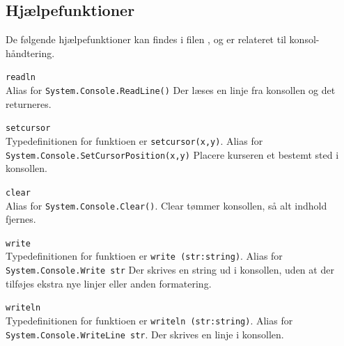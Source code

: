 \documentclass[a4paper]{article}
\begin{document}
    \subsection{Hjælpefunktioner} \label{ssec:helpers}
      De følgende hjælpefunktioner kan findes i filen , og er relateret til konsol-håndtering.
      \begin{description}
      
        \item{\texttt{readln}}~\\
          Alias for \lstinline$System.Console.ReadLine()$
          Der læses en linje fra konsollen og det returneres.

        \item{\texttt{setcursor}}~\\
          Typedefinitionen for funktioen er \lstinline$setcursor(x,y)$.
          Alias for \lstinline$System.Console.SetCursorPosition(x,y)$
          Placere kurseren et bestemt sted i konsollen.

        \item{\texttt{clear}}~\\
          Alias for \lstinline$System.Console.Clear()$.
          Clear tømmer konsollen, så alt indhold fjernes.

        \item{\texttt{write}}~\\
          Typedefinitionen for funktioen er \lstinline$write (str:string)$.
          Alias for \lstinline$System.Console.Write str$
          Der skrives en string ud i konsollen, uden at der tilføjes ekstra nye linjer eller anden formatering.

        \item{\texttt{writeln}}~\\
          Typedefinitionen for funktioen er \lstinline$writeln (str:string)$.
          Alias for \lstinline$System.Console.WriteLine str$.
          Der skrives en linje i konsollen.
      \end{description}~\\
      
\end{document}
